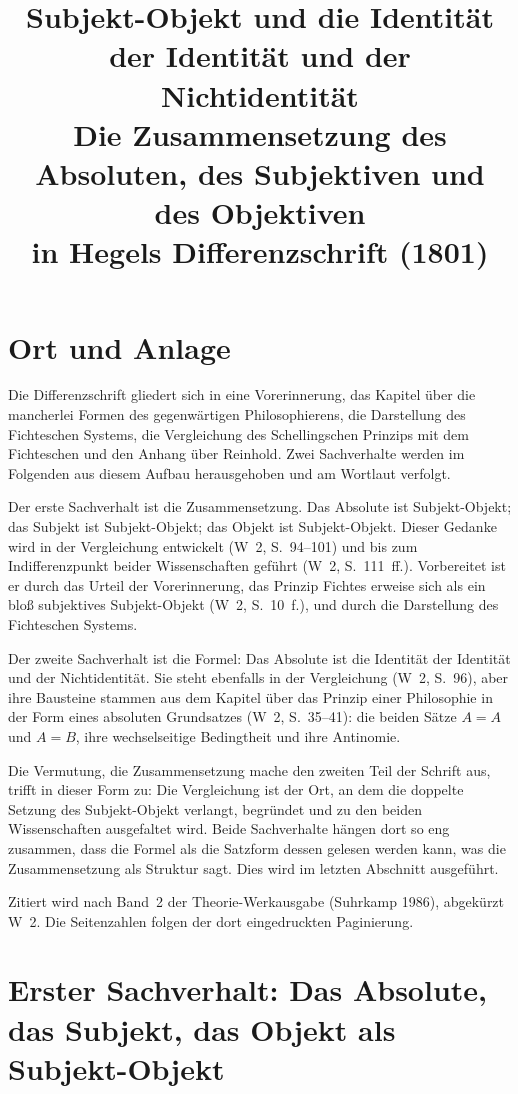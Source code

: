 \documentclass[11pt,a4paper]{article}
\title{Subjekt-Objekt und die Identität der Identität und der Nichtidentität\\[0.4em]
\large Die Zusammensetzung des Absoluten, des Subjektiven und des Objektiven\\ in Hegels Differenzschrift (1801)}
\author{}
\date{}
\newcommand{\SO}{Subjekt-Objekt}
\newcommand{\Werke}[1]{(W~2, S.~#1)}
\begin{document}
\maketitle

\section{Ort und Anlage}

Die Differenzschrift gliedert sich in eine Vorerinnerung, das Kapitel über die mancherlei Formen des gegenwärtigen Philosophierens, die Darstellung des Fichteschen Systems, die Vergleichung des Schellingschen Prinzips mit dem Fichteschen und den Anhang über Reinhold. Zwei Sachverhalte werden im Folgenden aus diesem Aufbau herausgehoben und am Wortlaut verfolgt.

Der erste Sachverhalt ist die Zusammensetzung. Das Absolute ist \SO{}; das Subjekt ist \SO{}; das Objekt ist \SO{}. Dieser Gedanke wird in der Vergleichung entwickelt \Werke{94--101} und bis zum Indifferenzpunkt beider Wissenschaften geführt \Werke{111~ff.}. Vorbereitet ist er durch das Urteil der Vorerinnerung, das Prinzip Fichtes erweise sich als ein bloß subjektives \SO{} \Werke{10~f.}, und durch die Darstellung des Fichteschen Systems.

Der zweite Sachverhalt ist die Formel: Das Absolute ist die Identität der Identität und der Nichtidentität. Sie steht ebenfalls in der Vergleichung \Werke{96}, aber ihre Bausteine stammen aus dem Kapitel über das Prinzip einer Philosophie in der Form eines absoluten Grundsatzes \Werke{35--41}: die beiden Sätze $A = A$ und $A = B$, ihre wechselseitige Bedingtheit und ihre Antinomie.

Die Vermutung, die Zusammensetzung mache den zweiten Teil der Schrift aus, trifft in dieser Form zu: Die Vergleichung ist der Ort, an dem die doppelte Setzung des \SO{} verlangt, begründet und zu den beiden Wissenschaften ausgefaltet wird. Beide Sachverhalte hängen dort so eng zusammen, dass die Formel als die Satzform dessen gelesen werden kann, was die Zusammensetzung als Struktur sagt. Dies wird im letzten Abschnitt ausgeführt.

Zitiert wird nach Band~2 der Theorie-Werkausgabe (Suhrkamp 1986), abgekürzt W~2. Die Seitenzahlen folgen der dort eingedruckten Paginierung.

\section{Erster Sachverhalt: Das Absolute, das Subjekt, das Objekt als \SO{}}
\end{document}
